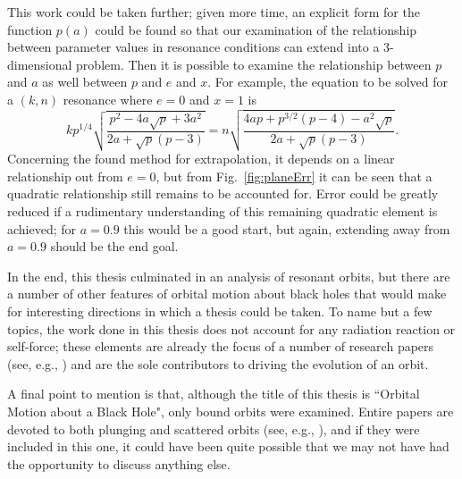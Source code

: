 This work could be taken further; given more time, an explicit form for the function $p(a)$ could be found so that our examination of the relationship between parameter values in resonance conditions can extend into a 3-dimensional problem.
Then it is possible to examine the relationship between $p$ and $a$ as well between $p$ and $e$ and $x$.
For example, the equation to be solved for a $(k,n)$ resonance where $e=0$ and $x=1$ is
\begin{equation}
    kp^{1/4}\sqrt{\frac{p^2-4a\sqrt{p}+3a^2}{2a+\sqrt{p}(p-3)}}=n\sqrt{\frac{4ap+p^{3/2}(p-4)-a^2\sqrt{p}}{2a+\sqrt{p}(p-3)}}.
\end{equation}
Concerning the found method for extrapolation, it depends on a linear relationship out from $e=0$, but from Fig.~\eqref{fig:planeErr} it can be seen that a quadratic relationship still remains to be accounted for.
Error could be greatly reduced if a rudimentary understanding of this remaining quadratic element is achieved; for $a=0.9$ this would be a good start, but again, extending away from $a=0.9$ should be the end goal.

In the end, this thesis culminated in an analysis of resonant orbits, but there are a number of other features of orbital motion about black holes that would make for interesting directions in which a thesis could be taken.
To name but a few topics, the work done in this thesis does not account for any radiation reaction or self-force; these elements are already the focus of a number of research papers (see, e.g., \cite{SagoRadReac, GaltsovRadReac, MeentSelfForce}) and are the sole contributors to driving the evolution of an orbit.

A final point to mention is that, although the title of this thesis is ``Orbital Motion about a Black Hole", only bound orbits were examined. Entire papers are devoted to both plunging and scattered orbits (see, e.g., \cite{plungingExample, scatteredExample}), and if they were included in this one, it could have been quite possible that we may not have had the opportunity to discuss anything else.